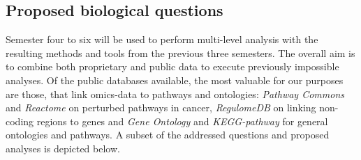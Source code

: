 \documentclass[twoside,fontsize=12pt]{article}
\begin{document}
\subsection*{Proposed biological questions}
Semester four to six will be used to perform multi-level analysis with the resulting methods and tools from the previous three semesters. The overall aim is to combine both proprietary and public data to execute previously impossible analyses. Of the public databases available, the most valuable for our purposes are those, that link omics-data to pathways and ontologies: \textit{Pathway Commons}\cite{Cerami2011} and \textit{Reactome}\cite{Jupp2014} on perturbed pathways in cancer, \textit{RegulomeDB}\cite{Boyle2012} on linking non-coding regions to genes and \textit{Gene Ontology}\cite{Ashburner2000} and \textit{KEGG-pathway}\cite{Kanehisa2000} for general ontologies and pathways. A subset of the addressed questions and proposed analyses is depicted below.
\renewcommand{\labelenumi}{\roman{enumi}.}
\end{document}
